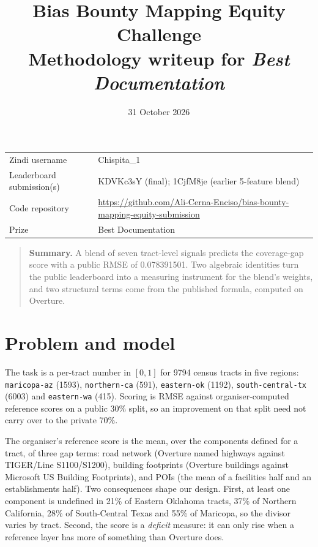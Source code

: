 \documentclass[a4paper]{article}
\title{\vspace{-1.2cm}\textbf{Bias Bounty Mapping Equity Challenge}\\[2pt]
\large Methodology writeup for \emph{Best Documentation}}
\author{}
\date{31 October 2026}
\newcommand{\zindiuser}{Chispita\_1}
\newcommand{\submissionid}{KDVKc3sY (final); 1CjfM8je (earlier 5-feature blend)}
\newcommand{\coderepo}{https://github.com/Ali-Cerna-Enciso/bias-bounty-mapping-equity-submission}
\begin{document}
\maketitle
\vspace{-1.1cm}

\begin{center}
\small
\begin{tabular}{@{}ll@{}}
\toprule
Zindi username & \zindiuser \\
Leaderboard submission(s) & \submissionid \\
Code repository & \url{\coderepo} \\
Prize & Best Documentation \\
\bottomrule
\end{tabular}
\end{center}

\begin{quote}
\small
\textbf{Summary.} A blend of seven tract-level signals predicts the coverage-gap score with a public RMSE
of \num{0.078391501}. Two algebraic identities turn the public leaderboard into a measuring instrument for
the blend's weights, and two structural terms come from the published formula, computed on Overture.
\end{quote}




\section{Problem and model}

The task is a per-tract number in $[0,1]$ for \num{9794} census tracts in five regions:
\texttt{maricopa-az} (\num{1593}), \texttt{northern-ca} (\num{591}),
\texttt{eastern-ok} (\num{1192}), \texttt{south-central-tx} (\num{6003}) and
\texttt{eastern-wa} (\num{415}). Scoring is RMSE against organiser-computed reference
scores on a public 30\% split, so an improvement on that split need not carry over to the private
70\%.

The organiser's reference score is the mean, over the components defined for a tract, of
three gap terms: road network (Overture named highways against TIGER/Line S1100/S1200),
building footprints (Overture buildings against Microsoft US Building Footprints), and POIs
(the mean of a facilities half and an establishments half). Two consequences shape our
design. First, at least one component is undefined in 21\% of Eastern Oklahoma tracts, 37\%
of Northern California, 28\% of South-Central Texas and 55\% of Maricopa, so the divisor
varies by tract. Second, the score is a \emph{deficit} measure: it can only rise when a
reference layer has more of something than Overture does.
\end{document}
